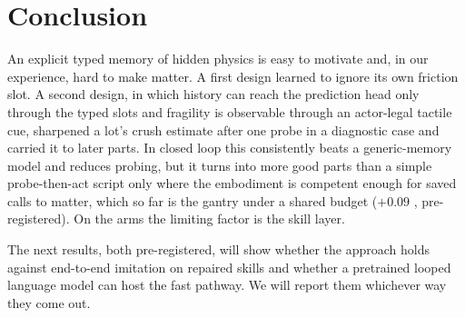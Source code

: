 \section{Conclusion}
\label{sec:conclusion}

An explicit typed memory of hidden physics is easy to motivate and, in our experience, hard to make matter. A
first design learned to ignore its own friction slot. A second design, in which history can reach the
prediction head only through the typed slots and fragility is observable through an actor-legal tactile cue,
sharpened a lot's crush estimate after one probe in a diagnostic case and carried it to later parts. In closed loop this
consistently beats a generic-memory model and reduces probing, but it turns into more good parts than a simple
probe-then-act script only where the embodiment is competent enough for saved calls to matter, which so far is
the gantry under a shared budget ($+0.09$ , pre-registered). On the arms the limiting factor is
the skill layer.

The next results, both pre-registered, will show whether the approach holds against end-to-end imitation on
repaired skills and whether a pretrained looped language model can host the fast pathway. We will report them
whichever way they come out.

